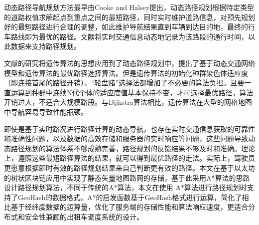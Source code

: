 动态路径导航规划方法最早由Cooke and Halsey提出，动态路径规划根据特定类型的道路权值求解起点到重点之间的最短路径，同时实时维护道路信息，对预先规划好的最短路径进行合理的调整，如此维护导航结果直到车辆到达目的地，最终的行车路线即为最优的路径。文献将实时交通信息动态地记录为该路段的通行时间，以此数据来支持路径规划。\par
文献的研究将遗传算法的思想应用到了动态路径规划中，提出了基于动态交通网络模型和遗传算法的最优路径选择算法。但是遗传算法的初始化种群染色体适应度（即连接首尾的路径开销）、“轮盘赌”选择法都增加了不必要的算法负担。且要一直运算到种群中连续N代个体的适应度值基本保持不变，才可选择最优路径，算法开销过大，不适合大规模路段。与Dijkstra算法相比，遗传算法在大型的网格地图中导航容易导致性能瓶颈。\par
即使是基于实时路况进行路径计算的动态导航，也存在实时交通信息获取的可靠性和准确性问题，以及数据的高效存储和服务器的实时响应等问题，这些问题导致动态路径规划的算法体系不够成熟完善，路径规划的反馈结果不够及时和准确。理论上，遵照这些最短路径算法的结果，就可以得到最优路径的走法。实际上，驾驶员更愿意根据即时有效的路径规划结果来自己判断更有效的路径。本文在基于以太坊的树状区块链应用中实现了静态矢量地图路网的存储，基于此采用A*算法的思路设计路径规划算法，不同于传统的A*算法，本文在使用 A*算法进行路径规划时支持了GeoHash的数据格式。A*的启发函数基于GeoHash格式进行运算，简化了相比基于经纬度数据的运算量，优化了服务端的存储性能和算法响应速度，更适合分布式和安全性兼顾的出租车调度系统的设计。


